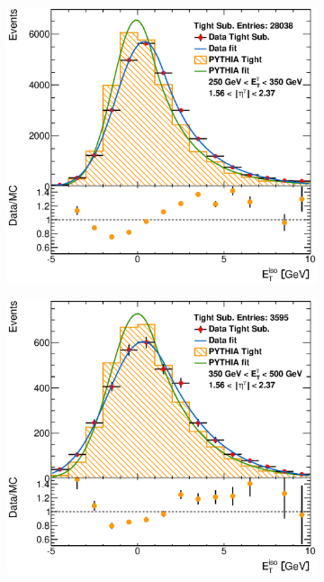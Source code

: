 \documentclass[12pt, twoside]{article}
\numberwithin{equation}{section}
\numberwithin{figure}{section}
\newenvironment{changemargin}[2]{%
\begin{list}{}{%
\setlength{\topsep}{0pt}%
\setlength{\leftmargin}{#1}%
\setlength{\rightmargin}{#2}%
\setlength{\listparindent}{\parindent}%
\setlength{\itemindent}{\parindent}%
\setlength{\parsep}{\parskip}%
}%
\item[]}{\end{list}}
\begin{document}
\begin{figure}[H]
\begin{changemargin}{-1.0cm}{-0.75cm}
\begin{changemargin}{-0.75cm}{-1.0cm}
        \hspace{-0.287\textwidth}
        \begin{subfigure}[b]{0.27\textwidth}
            \includegraphics[width=\textwidth]{./images/EtISOCorrection/T_MC_FITS-33(10GeV)(Before).eps}
        \end{subfigure}
        \begin{subfigure}[b]{0.27\textwidth}
            \includegraphics[width=\textwidth]{./images/EtISOCorrection/T_MC_FITS-34(10GeV)(Before).eps}

\end{subfigure}
\end{changemargin}
\end{changemargin}
\end{figure}
\end{document}
